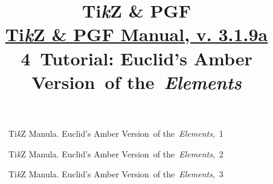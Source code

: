 \documentclass[a4paper,11pt]{article}
\title{Ti\textit{k}Z \& PGF \\
  \href{http://piotrkosoft.net/pub/mirrors/CTAN/graphics/pgf/base/doc/pgfmanual.pdf}{Ti\textit{k}Z \& PGF Manual, v. 3.1.9a} \\
  4~Tutorial: Euclid's Amber Version~of the~\emph{Elements}}
\author{}
\begin{document}





\maketitle %





\begin{figure}[ht]

  \centering

  \begin{tikzpicture}



  \end{tikzpicture}

  \caption{Ti\textit{k}Z Manula. Euclid's Amber Version~of
    the~\textit{Elements},~1}

\end{figure}





\begin{figure}[ht]

  \centering

  \begin{tikzpicture}







  \end{tikzpicture}

  \caption{Ti\textit{k}Z Manula. Euclid's Amber Version~of
    the~\emph{Elements},~2}

\end{figure}





\begin{figure}[ht]

  \centering

  \begin{tikzpicture}









  \end{tikzpicture}

  \caption{Ti\textit{k}Z Manula. Euclid's Amber Version~of
    the~\textit{Elements},~3}

\end{figure}
\end{document}
